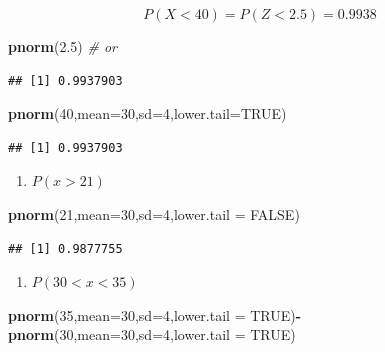 \documentclass[]{book}
\newenvironment{Shaded}{\begin{snugshade}}{\end{snugshade}}
\newcommand{\KeywordTok}[1]{\textcolor[rgb]{0.13,0.29,0.53}{\textbf{#1}}}
\newcommand{\DataTypeTok}[1]{\textcolor[rgb]{0.13,0.29,0.53}{#1}}
\newcommand{\DecValTok}[1]{\textcolor[rgb]{0.00,0.00,0.81}{#1}}
\newcommand{\FloatTok}[1]{\textcolor[rgb]{0.00,0.00,0.81}{#1}}
\newcommand{\CommentTok}[1]{\textcolor[rgb]{0.56,0.35,0.01}{\textit{#1}}}
\newcommand{\OtherTok}[1]{\textcolor[rgb]{0.56,0.35,0.01}{#1}}
\newcommand{\OperatorTok}[1]{\textcolor[rgb]{0.81,0.36,0.00}{\textbf{#1}}}
\newcommand{\NormalTok}[1]{#1}
\providecommand{\tightlist}{%
  \setlength{\itemsep}{0pt}\setlength{\parskip}{0pt}}
\begin{document}
\[
P(X<40)=P(Z<2.5)=0.9938
\]

\begin{Shaded}
\begin{Highlighting}[]
\KeywordTok{pnorm}\NormalTok{(}\FloatTok{2.5}\NormalTok{) }\CommentTok{# or }
\end{Highlighting}
\end{Shaded}

\begin{verbatim}
## [1] 0.9937903
\end{verbatim}

\begin{Shaded}
\begin{Highlighting}[]
\KeywordTok{pnorm}\NormalTok{(}\DecValTok{40}\NormalTok{,}\DataTypeTok{mean=}\DecValTok{30}\NormalTok{,}\DataTypeTok{sd=}\DecValTok{4}\NormalTok{,}\DataTypeTok{lower.tail=}\OtherTok{TRUE}\NormalTok{)}
\end{Highlighting}
\end{Shaded}

\begin{verbatim}
## [1] 0.9937903
\end{verbatim}

\begin{enumerate}
\def\labelenumi{\alph{enumi})}
\setcounter{enumi}{1}
\tightlist
\item
  \(P(x>21)\)
\end{enumerate}

\begin{Shaded}
\begin{Highlighting}[]
\KeywordTok{pnorm}\NormalTok{(}\DecValTok{21}\NormalTok{,}\DataTypeTok{mean=}\DecValTok{30}\NormalTok{,}\DataTypeTok{sd=}\DecValTok{4}\NormalTok{,}\DataTypeTok{lower.tail =} \OtherTok{FALSE}\NormalTok{)}
\end{Highlighting}
\end{Shaded}

\begin{verbatim}
## [1] 0.9877755
\end{verbatim}

\begin{enumerate}
\def\labelenumi{\alph{enumi})}
\setcounter{enumi}{2}
\tightlist
\item
  \(P(30<x<35)\)
\end{enumerate}

\begin{Shaded}
\begin{Highlighting}[]
\KeywordTok{pnorm}\NormalTok{(}\DecValTok{35}\NormalTok{,}\DataTypeTok{mean=}\DecValTok{30}\NormalTok{,}\DataTypeTok{sd=}\DecValTok{4}\NormalTok{,}\DataTypeTok{lower.tail =} \OtherTok{TRUE}\NormalTok{)}\OperatorTok{-}\KeywordTok{pnorm}\NormalTok{(}\DecValTok{30}\NormalTok{,}\DataTypeTok{mean=}\DecValTok{30}\NormalTok{,}\DataTypeTok{sd=}\DecValTok{4}\NormalTok{,}\DataTypeTok{lower.tail =} \OtherTok{TRUE}\NormalTok{)}
\end{Highlighting}
\end{Shaded}
\end{document}
